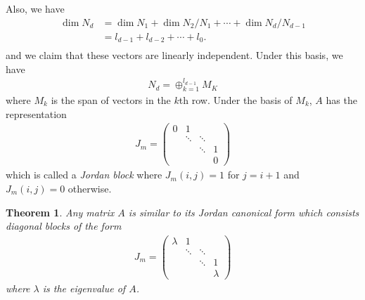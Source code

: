 \documentclass[11pt]{book}
\newtheorem{theorem}{Theorem}[section]
\theoremstyle{definition}
\numberwithin{equation}{subsection}
\begin{document}
Also, we have 
\begin{align*}
    \dim N_d & = \dim N_1 + \dim N_2/N_1 + \cdots + \dim N_d/N_{d-1} \\
    & = l_{d-1} + l_{d-2} + \cdots + l_0. \\
\end{align*}
and we claim that these vectors are linearly independent. Under this basis, we have 
\begin{align*}
    N_d = \oplus^{l_{d-1}}_{k=1} M_K
\end{align*}
where $M_k$ is the span of vectors in the $k$th row. Under the basis of $M_k$, $A$ has the representation
\begin{align*}
    J_m = \begin{pmatrix}
    0 & 1 &  &  \\
     &\ddots & \ddots & \\
     &   & \ddots & 1 \\
     &  &  & 0
    \end{pmatrix}
\end{align*}
which is called a \emph{Jordan block} where $J_m(i,j) = 1$ for $j = i+1$ and $J_m(i,j) = 0$ otherwise.

\medskip

\begin{theorem}
Any matrix $A$ is similar to its Jordan canonical form which consists diagonal blocks of the form 
\begin{align*}
    J_m = \begin{pmatrix}
    \lambda & 1 &  &  \\
     &\ddots & \ddots & \\
     &   & \ddots & 1 \\
     &  &  & \lambda
    \end{pmatrix}
\end{align*}
where $\lambda$ is the eigenvalue of $A$.
\end{theorem}

\medskip
\end{document}
